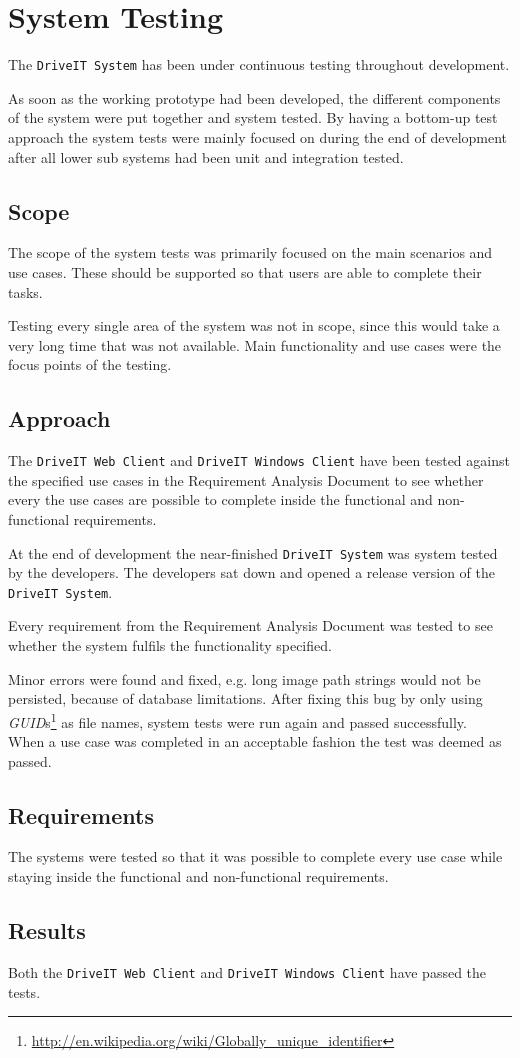 \section{System Testing}
The \texttt{DriveIT System} has been under continuous testing throughout development.

As soon as the working prototype had been developed, the different components of the system were put together and system tested. 
By having a bottom-up test approach the system tests were mainly focused on during the end of development after all lower sub systems had been unit and integration tested.

\subsection{Scope}
The scope of the system tests was primarily focused on the main scenarios and use cases. 
These should be supported so that users are able to complete their tasks. 

Testing every single area of the system was not in scope, since this would take a very long time that was not available.
Main functionality and use cases were the focus points of the testing.

\subsection{Approach}
The \texttt{DriveIT Web Client} and \texttt{DriveIT Windows Client} have been tested against the specified use cases in the Requirement Analysis Document to see whether every the use cases are possible to complete inside the functional and non-functional requirements.

At the end of development the near-finished \texttt{DriveIT System} was system tested by the developers. The developers sat down and opened a release version of the \texttt{DriveIT System}.

Every requirement from the Requirement Analysis Document was tested to see whether the system fulfils the functionality specified.

Minor errors were found and fixed, e.g. long image path strings would not be persisted, because of database limitations. After fixing this bug by only using \textit{GUID}s\footnote{\url{http://en.wikipedia.org/wiki/Globally_unique_identifier}} as file names, system tests were run again and passed successfully.\\

When a use case was completed in an acceptable fashion the test was deemed as passed.

\subsection{Requirements}
The systems were tested so that it was possible to complete every use case while staying inside the functional and non-functional requirements.

\subsection{Results}
Both the \texttt{DriveIT Web Client} and \texttt{DriveIT Windows Client} have passed the tests.